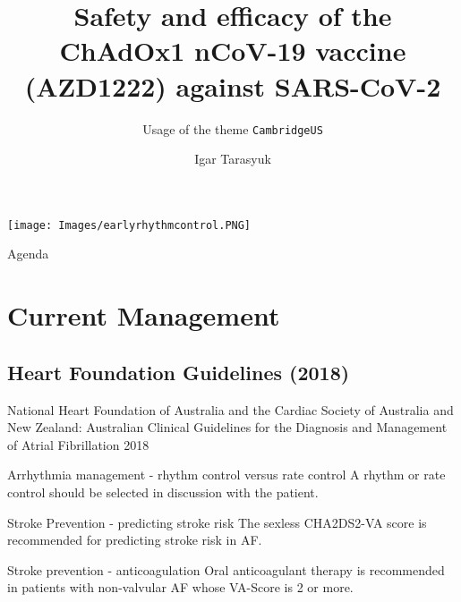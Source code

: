 \documentclass[UKenglish]{beamer}
\author{Igar Tarasyuk}
\title{Safety and efficacy of the ChAdOx1 nCoV-19 vaccine (AZD1222) against SARS-CoV-2}
\subtitle{Usage of the theme \texttt{CambridgeUS}}
\begin{document}
\nocite{*}


\section{}
\begin{frame}{}
    \texttt{[image: Images/earlyrhythmcontrol.PNG]}
\end{frame}
%
%
\begin{frame}{Agenda}
    \tableofcontents
\end{frame}


\section{Current Management}
\subsection{Heart Foundation Guidelines (2018)}


\begin{frame}{National Heart Foundation of Australia and the Cardiac Society of Australia and New Zealand: Australian Clinical Guidelines for the Diagnosis and Management of Atrial Fibrillation 2018}
    \begin{alertblock}{Arrhythmia management - rhythm control versus rate control}
        A rhythm or rate control should be selected in discussion with the patient.
    \end{alertblock}

    \begin{alertblock}{Stroke Prevention - predicting stroke risk}
        The sexless CHA2DS2-VA score is recommended for predicting stroke risk in AF.
    \end{alertblock}
    
    \begin{alertblock}{Stroke prevention - anticoagulation}
        Oral anticoagulant therapy is recommended in patients with non-valvular AF whose VA-Score is 2 or more.
    \end{alertblock}
        
\end{frame}
\end{document}
